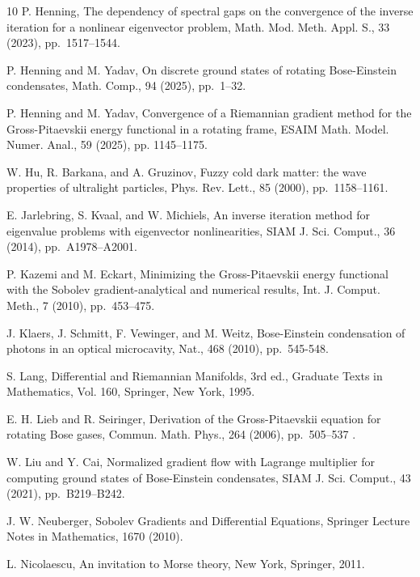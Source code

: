 \documentclass[preprint,3p]{elsarticle}
\begin{document}
\begin{thebibliography}{10}
	{ P. Henning}, { The dependency of spectral gaps on the convergence of the inverse iteration for a nonlinear eigenvector problem}, Math. Mod. Meth. Appl. S., 33 (2023), pp.~1517--1544.
	
	{ P. Henning and M. Yadav}, { On discrete ground states of rotating Bose-Einstein condensates}, Math. Comp., 94 (2025), pp.~1--32.
	
	{ P. Henning and M. Yadav}, { Convergence of a Riemannian gradient method for the
		Gross-Pitaevskii energy functional in a rotating frame}, ESAIM Math. Model. Numer. Anal., 59 (2025), pp. 1145--1175.
	
	{ W. Hu, R. Barkana, and A. Gruzinov}, { Fuzzy cold dark matter: the wave properties of ultralight particles}, Phys. Rev. Lett., 85 (2000), pp.~1158--1161.
	
	{ E. Jarlebring, S. Kvaal, and W. Michiels}, { An inverse iteration method for eigenvalue problems with eigenvector nonlinearities}, SIAM J. Sci. Comput., 36 (2014), pp.~A1978--A2001.
	
	{ P. Kazemi and M. Eckart}, { Minimizing the {G}ross-{P}itaevskii
		energy functional with the {S}obolev gradient-analytical and numerical
		results}, Int. J. Comput. Meth., 7 (2010), pp.~453--475.
	
	{ J. Klaers, J. Schmitt, F. Vewinger, and M. Weitz}, { 
		Bose-{E}instein condensation of photons in an optical microcavity},
	Nat., 468 (2010), pp.~545-548.
	
	S. Lang, Differential and Riemannian Manifolds, 3rd ed., Graduate Texts in Mathematics, Vol. 160, Springer, New York, 1995.
	
	{ E. H. Lieb and R. Seiringer}, { Derivation of the Gross-Pitaevskii equation for rotating Bose gases}, Commun. Math. Phys., 264 (2006), pp.~505--537 .
	
	{ W. Liu and Y. Cai}, { Normalized gradient flow with {L}agrange
		multiplier for computing ground states of {B}ose-{E}instein condensates},
	SIAM J. Sci. Comput., 43 (2021), pp.~B219--B242.
	
	{ J. W. Neuberger}, { Sobolev Gradients and Differential Equations}, Springer Lecture Notes in Mathematics, 1670 (2010).
	
	{ L. Nicolaescu}, { An invitation to Morse theory}, New York, Springer, 2011.
	

\end{thebibliography}
\end{document}
